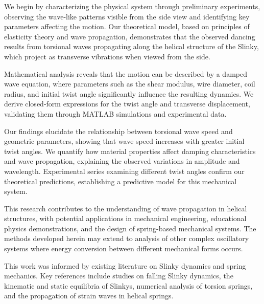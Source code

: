 \documentclass{mcmthesis}  %
\begin{document}
We begin by characterizing the physical system through preliminary experiments, observing the wave-like patterns visible from the side view and identifying key parameters affecting the motion. Our theoretical model, based on principles of elasticity theory and wave propagation, demonstrates that the observed dancing results from torsional waves propagating along the helical structure of the Slinky, which project as transverse vibrations when viewed from the side.

Mathematical analysis reveals that the motion can be described by a damped wave equation, where parameters such as the shear modulus, wire diameter, coil radius, and initial twist angle significantly influence the resulting dynamics. We derive closed-form expressions for the twist angle and transverse displacement, validating them through MATLAB simulations and experimental data.

Our findings elucidate the relationship between torsional wave speed and geometric parameters, showing that wave speed increases with greater initial twist angles. We quantify how material properties affect damping characteristics and wave propagation, explaining the observed variations in amplitude and wavelength. Experimental series examining different twist angles confirm our theoretical predictions, establishing a predictive model for this mechanical system.

This research contributes to the understanding of wave propagation in helical structures, with potential applications in mechanical engineering, educational physics demonstrations, and the design of spring-based mechanical systems. The methods developed herein may extend to analysis of other complex oscillatory systems where energy conversion between different mechanical forms occurs.

This work was informed by existing literature on Slinky dynamics and spring mechanics. Key references include studies on falling Slinky dynamics\cite{falling-slinky}, the kinematic and static equilibria of Slinkys\cite{kinematics-slinky}, numerical analysis of torsion springs\cite{torsion-springs}, and the propagation of strain waves in helical springs\cite{strain-waves-numerical, strain-waves-cylindrical}.

\printbibliography  %

\end{document}
